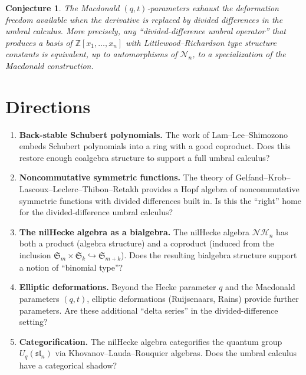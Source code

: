 \documentclass[11pt]{amsart}
\newtheorem{conjecture}[theorem]{Conjecture}
\theoremstyle{definition}
\newcommand{\Z}{\mathbb{Z}}
\newcommand{\fS}{\mathfrak{S}}
\newcommand{\cN}{\mathcal{N}}
\newcommand{\NH}{\mathcal{NH}}
\begin{document}
\begin{conjecture}
  The Macdonald $(q,t)$-parameters exhaust the deformation freedom
  available when the derivative is replaced by divided differences
  in the umbral calculus. More precisely, any ``divided-difference
  umbral operator'' that produces a basis of $\Z[x_1, \dots, x_n]$
  with Littlewood--Richardson type structure constants is
  equivalent, up to automorphisms of $\cN_n$, to a specialization
  of the Macdonald construction.
\end{conjecture}

\section{Directions}

\begin{enumerate}
  \item \textbf{Back-stable Schubert polynomials.} The work of
    Lam--Lee--Shimozono \cite{LLS} embeds Schubert polynomials into
    a ring with a good coproduct. Does this restore enough coalgebra
    structure to support a full umbral calculus?

  \item \textbf{Noncommutative symmetric functions.} The theory of
    Gelfand--Krob--Lascoux--Leclerc--Thibon--Retakh \cite{GKLLTR}
    provides a Hopf algebra of noncommutative symmetric functions
    with divided differences built in. Is this the ``right'' home
    for the divided-difference umbral calculus?

  \item \textbf{The nilHecke algebra as a bialgebra.} The nilHecke
    algebra $\NH_n$ has both a product (algebra structure) and a
    coproduct (induced from the inclusion
    $\fS_m \times \fS_k \hookrightarrow \fS_{m+k}$). Does the
    resulting bialgebra structure support a notion of
    ``binomial type''?

  \item \textbf{Elliptic deformations.} Beyond the Hecke parameter
    $q$ and the Macdonald parameters $(q,t)$, elliptic
    deformations (Ruijsenaars, Rains) provide further parameters.
    Are these additional ``delta series'' in the divided-difference
    setting?

  \item \textbf{Categorification.} The nilHecke algebra
    categorifies the quantum group $U_q(\mathfrak{sl}_n)$ via
    Khovanov--Lauda--Rouquier algebras. Does the umbral calculus
    have a categorical shadow?
\end{enumerate}
\end{document}
